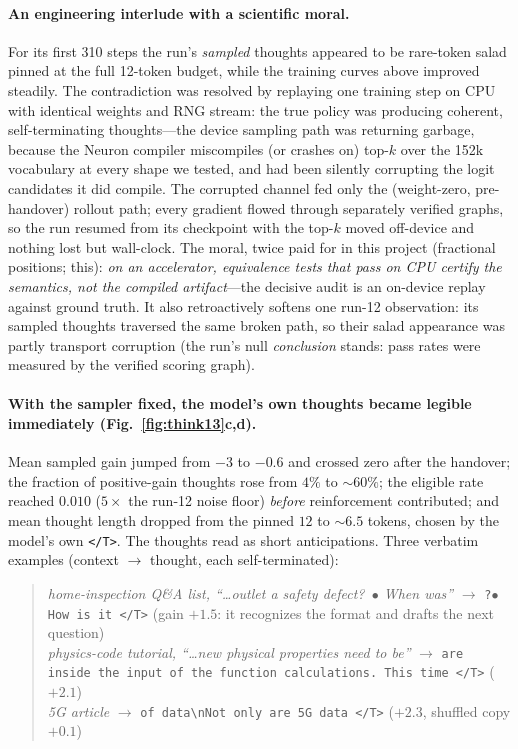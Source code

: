 \documentclass{article} %
\newcommand{\tend}{\texttt{</T>}}
\begin{document}
\paragraph{An engineering interlude with a scientific moral.} For its first 310 steps the run's \emph{sampled} thoughts appeared to be rare-token salad pinned at the full 12-token budget, while the training curves above improved steadily. The contradiction was resolved by replaying one training step on CPU with identical weights and RNG stream: the true policy was producing coherent, self-terminating thoughts---the device sampling path was returning garbage, because the Neuron compiler miscompiles (or crashes on) top-$k$ over the 152k vocabulary at every shape we tested, and had been silently corrupting the logit candidates it did compile. The corrupted channel fed only the (weight-zero, pre-handover) rollout path; every gradient flowed through separately verified graphs, so the run resumed from its checkpoint with the top-$k$ moved off-device and nothing lost but wall-clock. The moral, twice paid for in this project (fractional positions; this): \emph{on an accelerator, equivalence tests that pass on CPU certify the semantics, not the compiled artifact}---the decisive audit is an on-device replay against ground truth. It also retroactively softens one run-12 observation: its sampled thoughts traversed the same broken path, so their salad appearance was partly transport corruption (the run's null \emph{conclusion} stands: pass rates were measured by the verified scoring graph).

\paragraph{With the sampler fixed, the model's own thoughts became legible immediately (Fig.~\ref{fig:think13}c,d).} Mean sampled gain jumped from $-3$ to $-0.6$ and crossed zero after the handover; the fraction of positive-gain thoughts rose from $4\%$ to ${\sim}60\%$; the eligible rate reached $0.010$ ($5\times$ the run-12 noise floor) \emph{before} reinforcement contributed; and mean thought length dropped from the pinned $12$ to ${\sim}6.5$ tokens, chosen by the model's own \tend. The thoughts read as short anticipations. Three verbatim examples (context $\to$ thought, each self-terminated):
\begin{quote}\small
\emph{home-inspection Q\&A list, ``\ldots outlet a safety defect?\ $\bullet$ When was''} $\to$ \texttt{?\;$\bullet$ How is it \tend} \quad (gain $+1.5$: it recognizes the format and drafts the next question)\\
\emph{physics-code tutorial, ``\ldots new physical properties need to be''} $\to$ \texttt{are inside the input of the function calculations. This time \tend} \quad ($+2.1$)\\
\emph{5G article} $\to$ \texttt{of data\;\textbackslash n\;Not only are 5G data \tend} \quad ($+2.3$, shuffled copy $+0.1$)
\end{quote}
\end{document}
